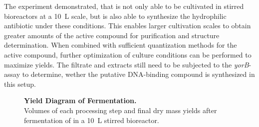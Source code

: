 The experiment demonstrated, that \tue{} is not only able to be cultivated in stirred bioreactors at a \SI{10}{\liter} scale, but is also able to synthesize the hydrophilic antibiotic under these conditions.
This enables larger cultivation scales to obtain greater amounts of the active compound for purification and structure determination.
When combined with sufficient quantization methods for the active compound, further optimization of culture conditions can be performed to maximize yields.
The filtrate and extracts still need to be subjected to the \emph{yorB}-assay to determine, wether the putative DNA-binding compound is synthesized in this setup.


\begin{figure}[htbp]
\centering

\caption[Yield Diagram of \tue{} Fermentation]{%
	\textbf{Yield Diagram of \tue{} Fermentation.}\\
	Volumes of each processing step and final dry mass yields after fermentation of \tue{} in a \SI{10}{\liter} stirred bioreactor.}
\label{fig:ferm_process}
\end{figure}

